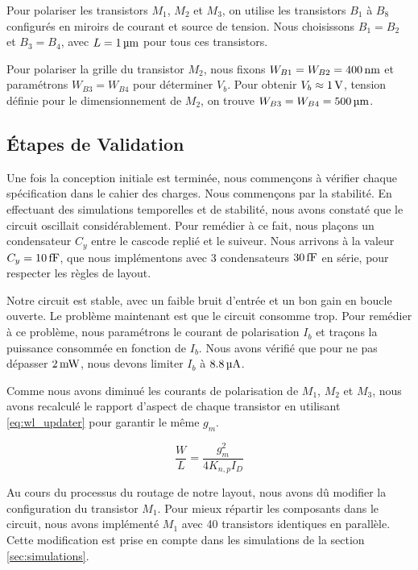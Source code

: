 \documentclass[a4paper,12pt]{article}
\numberwithin{equation}{section}
\newcommand{\?}{\stackrel{?}{=}}
\newcommand{\sis}[2]{\complexnum{#1}\,\si[per-mode=symbol]{#2}}
\begin{document}
Pour polariser les transistors $M_1$, $M_2$ et $M_3$, on utilise les transistors $B_1$ à $B_8$ configurés en miroirs de courant et source de tension. Nous choisissons $B_1=B_2$ et $B_3=B_4$, avec $L=\sis{1}{\micro\meter}$ pour tous ces transistors.

Pour polariser la grille du transistor $M_2$, nous fixons $W_{B1}=W_{B2}=\sis{400}{\nano\meter}$ et paramétrons $W_{B3}=W_{B4}$ pour déterminer $ V_b$. Pour obtenir $V_b\approx\sis{1}{\volt}$, tension définie pour le dimensionnement de $M_2$, on trouve $W_{B3}=W_{B4}=\sis{500}{\micro\meter}$.

\subsection{Étapes de Validation}

Une fois la conception initiale est terminée, nous commençons à vérifier chaque spécification dans le cahier des charges. Nous commençons par la stabilité. En effectuant des simulations temporelles et de stabilité, nous avons constaté que le circuit oscillait considérablement. Pour remédier à ce fait, nous plaçons un condensateur $C_y$ entre le cascode replié et le suiveur. Nous arrivons à la valeur $C_y=\sis{10}{\femto\farad}$, que nous implémentons avec 3 condensateurs $\sis{30}{\femto\farad}$ en série, pour respecter les règles de layout.

Notre circuit est stable, avec un faible bruit d'entrée et un bon gain en boucle ouverte. Le problème maintenant est que le circuit consomme trop. Pour remédier à ce problème, nous paramétrons le courant de polarisation $I_b$ et traçons la puissance consommée en fonction de $I_b$. Nous avons vérifié que pour ne pas dépasser $\sis{2}{\milli\watt}$, nous devons limiter $I_b$ à $\sis{8.8}{\micro\ampere}$.

Comme nous avons diminué les courants de polarisation de $M_1$, $M_2$ et $M_3$, nous avons recalculé le rapport d'aspect de chaque transistor en utilisant \eqref{eq:wl_updater} pour garantir le même $g_m$.

\begin{equation}\label{eq:wl_updater}
    \frac{W}{L}=\frac{g_m^2}{4K_{n,p}I_D}
\end{equation}

Au cours du processus du routage de notre layout, nous avons dû modifier la configuration du transistor $M_1$. Pour mieux répartir les composants dans le circuit, nous avons implémenté $M_1$ avec 40 transistors identiques en parallèle. Cette modification est prise en compte dans les simulations de la section \ref{sec:simulations}.
\end{document}
